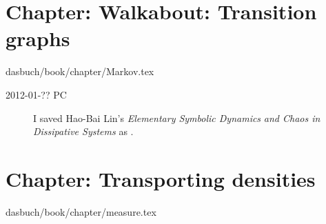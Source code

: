 %


%


\section{Chapter: Walkabout: Transition graphs}
\label{c-Markov}\noindent dasbuch/book/chapter/Markov.tex
\begin{description}
\item[2012-01-?? PC]
I saved Hao-Bai Lin's
{{\em Elementary Symbolic Dynamics}} {\em and Chaos in Dissipative Systems}
as .
\end{description}

%

\section{Chapter: Transporting densities}
\label{c-measure}\noindent dasbuch/book/chapter/measure.tex

